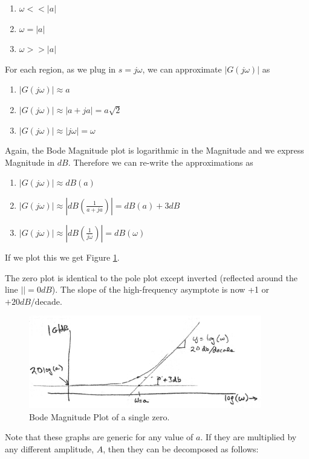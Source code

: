 \begin{enumerate}
  \item  $\omega << |a|$
  \item  $\omega = |a|$
  \item  $\omega >> |a|$
\end{enumerate}

For each region, as we plug in $s=j\omega$, we can approximate $|G(j\omega)|$ as

\begin{enumerate}
  \item  $|G(j\omega)| \approx a$
  \item  $|G(j\omega)| \approx \left | a+ja \right | = a\sqrt{2}$
  \item  $|G(j\omega)| \approx \left | j\omega \right | = \omega$
\end{enumerate}

Again, the Bode Magnitude plot is logarithmic in the Magnitude and we express Magnitude in $dB$.
Therefore we can re-write the  approximations  as

\begin{enumerate}
  \item  $|G(j\omega)| \approx dB(a)$
  \item  $|G(j\omega)| \approx \left | dB(\frac{1}{a+ja})    \right | = dB(a)+3dB$
  \item  $|G(j\omega)| \approx \left | dB(\frac{1}{j\omega}) \right | = dB(\omega)$
\end{enumerate}

If we plot this we get Figure \ref{BodeMagOneZero}.

The zero plot is identical to the pole plot except inverted (reflected around the line $|| = 0dB$).
The slope of the high-frequency asymptote is now +1 or $+20dB/\mathrm{decade}$.


\begin{figure}\centering
\includegraphics[width=4.0in]{figs05/00735a.png}
\caption{Bode Magnitude Plot of a single zero.}\label{BodeMagOneZero}
\end{figure}


Note that these graphs are generic for any value of $a$.   If they are multiplied by any different amplitude, $A$, then they can be decomposed as follows:

